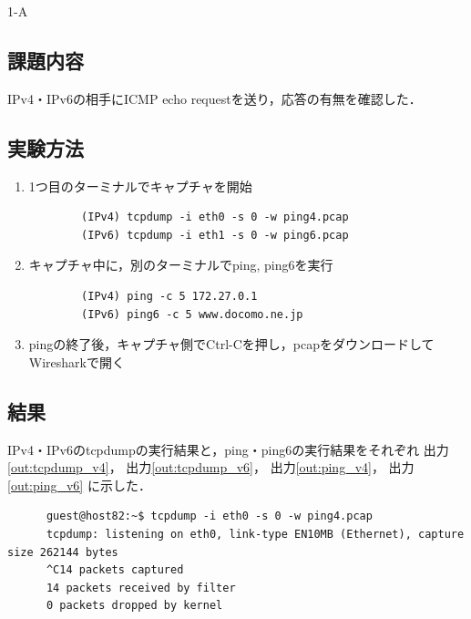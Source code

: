 \begin{maintask}{1-A}
  \subsection*{課題内容}
  IPv4・IPv6の相手にICMP echo requestを送り，応答の有無を確認した．

  \subsection*{実験方法}
  \begin{enumerate}
    \item 1つ目のターミナルでキャプチャを開始
      \begin{verbatim}
        (IPv4) tcpdump -i eth0 -s 0 -w ping4.pcap
        (IPv6) tcpdump -i eth1 -s 0 -w ping6.pcap
      \end{verbatim}

    \item キャプチャ中に，別のターミナルでping, ping6を実行
      \begin{verbatim}
        (IPv4) ping -c 5 172.27.0.1
        (IPv6) ping6 -c 5 www.docomo.ne.jp
      \end{verbatim}
    
    \item pingの終了後，キャプチャ側でCtrl-Cを押し，pcapをダウンロードしてWiresharkで開く
  \end{enumerate}
  
  \subsection*{結果}
  IPv4・IPv6のtcpdumpの実行結果と，ping・ping6の実行結果をそれぞれ
  出力\ref{out:tcpdump_v4}，
  出力\ref{out:tcpdump_v6}，
  出力\ref{out:ping_v4}，
  出力\ref{out:ping_v6}
  に示した．

  \begin{termout}[H]
    \caption{tcpdump(IPv4) の実行結果}\label{out:tcpdump_v4}
    \begin{verbatim}
      guest@host82:~$ tcpdump -i eth0 -s 0 -w ping4.pcap                                                                        
      tcpdump: listening on eth0, link-type EN10MB (Ethernet), capture size 262144 bytes
      ^C14 packets captured
      14 packets received by filter
      0 packets dropped by kernel
     \end{verbatim}
  \end{termout} 


\end{maintask}
